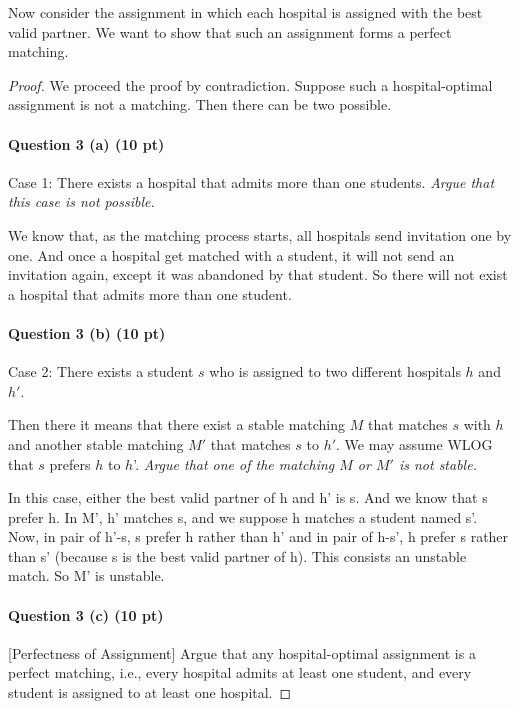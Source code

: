 Now consider the assignment in which each hospital is assigned with the best valid partner. We want to show that such an assignment forms a perfect matching. 

\medskip

\begin{proof}

We proceed the proof by contradiction.
Suppose such a hospital-optimal assignment is not a matching.
Then there can be two possible. 

\medskip

\paragraph*{Question 3 (a) (10 pt)} Case 1: There exists a hospital that admits more than one students.
{\em Argue that this case is not possible.}

We know that, as the matching process starts, all hospitals send invitation one by one. And once a hospital get matched with a student, it will not send an invitation again, except it was abandoned by that student. So there will not exist a hospital that admits more than one student. \\

\medskip

\paragraph*{Question 3 (b) (10 pt)} Case 2: There exists a student $s$ who is assigned to two different hospitals $h$ and $h'$. 

Then there it means that there exist a stable matching $M$ that matches $s$ with $h$ and another stable matching $M'$ that matches $s$ to $h'$.  We may assume WLOG that $s$ prefers $h$ to $h$'. {\em Argue that one of the matching $M$ or $M'$ is not stable.}

In this case, either the best valid partner of h and h' is s. And we know that s prefer h. In M', h' matches s, and we suppose h matches a student named s'. Now, in pair of h'-s, s prefer h rather than h' and in pair of h-s', h prefer s rather than s' (because s is the best valid partner of h). This consists an unstable match. So M' is unstable.

\medskip

\paragraph*{Question 3 (c) (10 pt)} [Perfectness of Assignment] Argue that any hospital-optimal assignment is a perfect matching, i.e., every hospital admits at least one student, and every student is assigned to at least one hospital. 


\end{proof}
